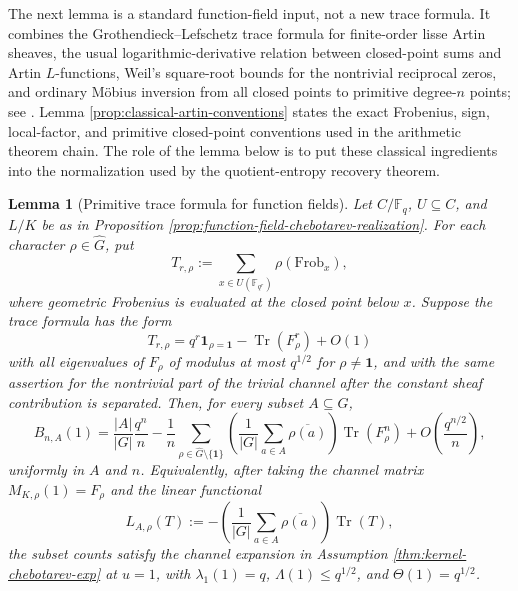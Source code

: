 \documentclass[12pt,a4paper]{article}
\theoremstyle{plain}
\newtheorem{lemma}[theorem]{Lemma}
\theoremstyle{definition}
\numberwithin{equation}{section}
\DeclareMathOperator{\Tr}{Tr}
\newcommand{\FF}{\mathbb{F}}
\newcommand{\ind}{\mathbf{1}}
\begin{document}
The next lemma is a standard function-field input, not a new trace formula. It combines the Grothendieck--Lefschetz trace formula for finite-order lisse Artin sheaves, the usual logarithmic-derivative relation between closed-point sums and Artin \(L\)-functions, Weil's square-root bounds for the nontrivial reciprocal zeros, and ordinary M\"obius inversion from all closed points to primitive degree-\(n\) points; see \cite{Serre1981,Rosen2002}. Lemma \ref{prop:classical-artin-conventions} states the exact Frobenius, sign, local-factor, and primitive closed-point conventions used in the arithmetic theorem chain. The role of the lemma below is to put these classical ingredients into the normalization used by the quotient-entropy recovery theorem.

\begin{lemma}[Primitive trace formula for function fields]\label{lem:function-field-primitive-trace-formula}
Let \(C/\FF_q\), \(U\subseteq C\), and \(L/K\) be as in Proposition \ref{prop:function-field-chebotarev-realization}. For each character \(\rho\in\widehat G\), put
\[
T_{r,\rho}:=\sum_{x\in U(\FF_{q^r})}\rho(\mathrm{Frob}_x),
\]
where geometric Frobenius is evaluated at the closed point below \(x\). Suppose the trace formula has the form
\[
T_{r,\rho}=q^r\mathbf 1_{\rho=\ind}-\Tr(F_\rho^r)+O(1)
\]
with all eigenvalues of \(F_\rho\) of modulus at most \(q^{1/2}\) for \(\rho\neq\ind\), and with the same assertion for the nontrivial part of the trivial channel after the constant sheaf contribution is separated. Then, for every subset \(A\subseteq G\),
\[
B_{n,A}(1)
=
\frac{|A|}{|G|}\frac{q^n}{n}
-\frac1n\sum_{\rho\in\widehat G\setminus\{\ind\}}
\left(\frac1{|G|}\sum_{a\in A}\overline{\rho(a)}\right)
\Tr(F_\rho^n)
+O\!\left(\frac{q^{n/2}}{n}\right),
\]
uniformly in \(A\) and \(n\). Equivalently, after taking the channel matrix \(M_{K,\rho}(1)=F_\rho\) and the linear functional
\[
L_{A,\rho}(T):=-\left(\frac1{|G|}\sum_{a\in A}\overline{\rho(a)}\right)\Tr(T),
\]
the subset counts satisfy the channel expansion in Assumption \ref{thm:kernel-chebotarev-exp} at \(u=1\), with \(\lambda_1(1)=q\), \(\Lambda(1)\le q^{1/2}\), and \(\Theta(1)=q^{1/2}\).
\end{lemma}
\end{document}
